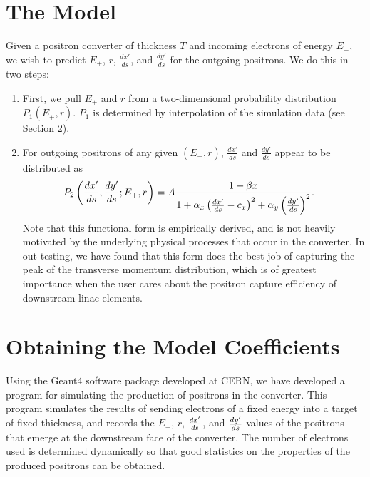 \documentclass[12pt]{article}
\begin{document}
\newpage

\section{The Model}
\label{s:model}

Given a positron converter of thickness $T$ and incoming electrons of energy $E_-$, we wish to predict $E_+$, $r$, $\frac{dx'}{ds}$, and $\frac{dy'}{ds}$ for the outgoing positrons.
We do this in two steps:
\begin{enumerate}
\item
First, we pull $E_+$ and $r$ from a two-dimensional probability distribution $P_1(E_+, r)$.
$P_1$ is determined by interpolation of the simulation data (see Section \ref{s:simulation}).

\item
For outgoing positrons of any given $(E_+, r)$, $\frac{dx'}{ds}$ and $\frac{dy'}{ds}$ appear to be distributed as
\begin{align}
P_2 \left( \frac{dx'}{ds}, \frac{dy'}{ds} ; E_+, r \right) & = A \frac{1 + \beta x}{1 + \alpha_x \left( \frac{dx'}{ds} - c_x \right)^2 + \alpha_y \left( \frac{dy'}{ds} \right)^2}.
\end{align}
Note that this functional form is empirically derived, and is not heavily motivated by the underlying physical processes that occur in the converter.
In out testing, we have found that this form does the best job of capturing the peak of the transverse momentum distribution, which is of greatest importance when the user cares about the positron capture efficiency of downstream linac elements.

\end{enumerate}



\section{Obtaining the Model Coefficients}
\label{s:simulation}

Using the Geant4\cite{geant} software package developed at CERN, we have developed a program for simulating the production of positrons in the converter.
This program simulates the results of sending electrons of a fixed energy into a target of fixed thickness, and records the $E_+$, $r$, $\frac{dx'}{ds}$, and $\frac{dy'}{ds}$ values of the positrons that emerge at the downstream face of the converter.
The number of electrons used is determined dynamically so that good statistics on the properties of the produced positrons can be obtained.
\end{document}
